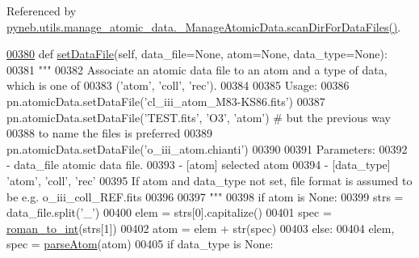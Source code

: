 Referenced by \hyperlink{manage__atomic__data_8py_source_l00358}{pyneb.\+utils.\+manage\+\_\+atomic\+\_\+data.\+\_\+\+Manage\+Atomic\+Data.\+scan\+Dir\+For\+Data\+Files()}.


\begin{DoxyCode}
\hypertarget{classpyneb_1_1utils_1_1manage__atomic__data_1_1___manage_atomic_data_l00380}{}\hyperlink{classpyneb_1_1utils_1_1manage__atomic__data_1_1___manage_atomic_data_a76ee45cb9b8a5ead8cd716ebc0facf92}{00380}     \textcolor{keyword}{def }\hyperlink{classpyneb_1_1utils_1_1manage__atomic__data_1_1___manage_atomic_data_a76ee45cb9b8a5ead8cd716ebc0facf92}{setDataFile}(self, data\_file=None, atom=None, data\_type=None):
00381         \textcolor{stringliteral}{"""}
00382 \textcolor{stringliteral}{        Associate an atomic data file to an atom and a type of data, which is one of }
00383 \textcolor{stringliteral}{            ('atom', 'coll', 'rec').}
00384 \textcolor{stringliteral}{}
00385 \textcolor{stringliteral}{        Usage:}
00386 \textcolor{stringliteral}{            pn.atomicData.setDataFile('cl\_iii\_atom\_M83-KS86.fits')}
00387 \textcolor{stringliteral}{            pn.atomicData.setDataFile('TEST.fits', 'O3', 'atom') # but the previous way }
00388 \textcolor{stringliteral}{                to name the files is preferred}
00389 \textcolor{stringliteral}{            pn.atomicData.setDataFile('o\_iii\_atom.chianti')}
00390 \textcolor{stringliteral}{}
00391 \textcolor{stringliteral}{        Parameters:}
00392 \textcolor{stringliteral}{            - data\_file    atomic data file. }
00393 \textcolor{stringliteral}{            - [atom]         selected atom}
00394 \textcolor{stringliteral}{            - [data\_type]    'atom', 'coll', 'rec'}
00395 \textcolor{stringliteral}{            If atom and data\_type not set, file format is assumed to be e.g. o\_iii\_coll\_REF.fits}
00396 \textcolor{stringliteral}{}
00397 \textcolor{stringliteral}{        """}          
00398         \textcolor{keywordflow}{if} atom \textcolor{keywordflow}{is} \textcolor{keywordtype}{None}:
00399             strs = data\_file.split(\textcolor{stringliteral}{'\_'})
00400             elem = strs[0].capitalize()
00401             spec = \hyperlink{namespacepyneb_1_1utils_1_1misc_a97329c3ce57bd870421672b90e3e6541}{roman\_to\_int}(strs[1])
00402             atom = elem + str(spec)
00403         \textcolor{keywordflow}{else}:
00404             elem, spec = \hyperlink{namespacepyneb_1_1utils_1_1misc_a8c069186002a3e73dd474958e35034d5}{parseAtom}(atom)
00405         \textcolor{keywordflow}{if} data\_type \textcolor{keywordflow}{is} \textcolor{keywordtype}{None}:

\end{DoxyCode}
